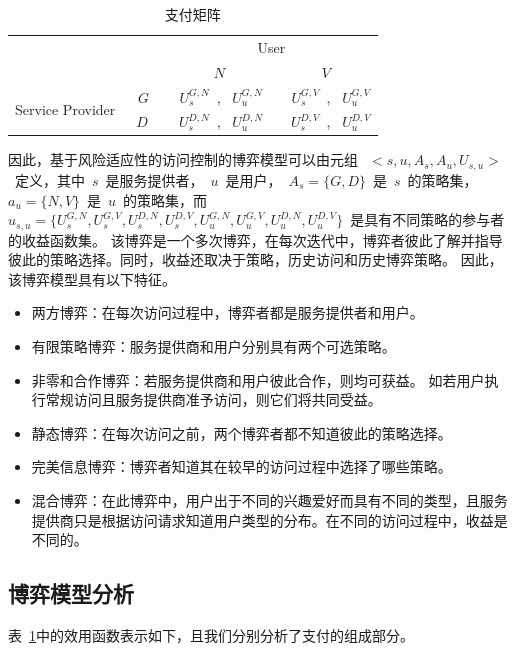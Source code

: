 \begin{table}[htb]
	\caption{支付矩阵}\label{tab:payoff}
	\centering 
	\begin{tabular}{cccc}
		\toprule
		\multicolumn{2}{c}{\multirow{2}{*}{}} & \multicolumn{2}{c}{User} \\
		\cline{3-4}
		& & ~$N~$~ & ~$V~$~ \\	
		\hline
		\multirow{2}{*}{Service Provider} & ~$G$~ &~$U_s^{G,N}$~, ~$U_u^{G,N}$~ & ~$U_s^{G,V}$~, ~$U_u^{G,V}$\\
		\cline{2-4}
		& ~$D~$~ & ~$U_s^{D,N}$~, ~$U_u^{D,N}$~ & ~$U_s^{D,V}$~, ~$U_u^{D,V}$\\
		\toprule
	\end{tabular}
\end{table}


因此，基于风险适应性的访问控制的博弈模型可以由元组~$~<s,u,A_s,A_u,U_{s,u}>~$~定义，其中~$s$~是服务提供者，~$u$~是用户，~$A_s=\{G,D\}$~是~$s$~的策略集，~$a_u=\{N,V\}$~是~$u$~的策略集，而~$u_{s,u}=\{U_s^{G,N}, U_s^{G,V}, U_s^{D,N}, U_s^{D,V}, U_u^{G,N}, U_u^{G,V}, U_u^{D,N}, U_u^{D,V}\}$~是具有不同策略的参与者的收益函数集。 该博弈是一个多次博弈，在每次迭代中，博弈者彼此了解并指导彼此的策略选择。同时，收益还取决于策略，历史访问和历史博弈策略。 因此，该博弈模型具有以下特征。
\begin{itemize}
	\item 两方博弈：在每次访问过程中，博弈者都是服务提供者和用户。
	\item 有限策略博弈：服务提供商和用户分别具有两个可选策略。
	\item 非零和合作博弈：若服务提供商和用户彼此合作，则均可获益。 如若用户执行常规访问且服务提供商准予访问，则它们将共同受益。
	\item 静态博弈：在每次访问之前，两个博弈者都不知道彼此的策略选择。
	\item 完美信息博弈：博弈者知道其在较早的访问过程中选择了哪些策略。
	\item 混合博弈：在此博弈中，用户出于不同的兴趣爱好而具有不同的类型，且服务提供商只是根据访问请求知道用户类型的分布。在不同的访问过程中，收益是不同的。
\end{itemize}

\subsection{博弈模型分析}

表~\ref{tab:payoff}中的效用函数表示如下，且我们分别分析了支付的组成部分。

